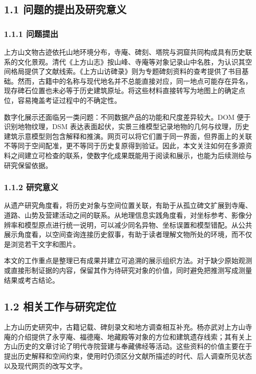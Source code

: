 \documentclass[UTF8,a4paper,zihao=-4]{ctexart}
\begin{document}
\subsection*{1.1 问题的提出及研究意义}

\subsubsection*{1.1.1 问题提出}

上方山文物古迹依托山地环境分布，寺庵、碑刻、塔院与洞窟共同构成具有历史联系的文化景观。清代《上方山志》按山峰、寺庵等对象记录山中名胜，为认识其空间格局提供了文献线索\cite{r1}。《上方山访碑录》则为专题碑刻资料的查考提供了书目基础\cite{r2}。然而，古籍中的名称与现代地名并不总能直接对应，同一地点可能存在异名，现存碑石位置也未必等于历史建筑原址。将这些材料直接转写为地图上的确定点位，容易掩盖考证过程中的不确定性。


数字化展示还面临另一类问题：不同数据产品的功能和尺度差异较大。DOM 便于识别地物纹理，DSM 表达表面起伏，实景三维模型记录地物的几何与纹理，历史建筑示意模型则包含解释和推演。网页可以将它们置于同一界面，但界面上的关联不等同于空间配准，更不等同于历史复原得到验证。因此，本文关注如何在多源资料之间建立可检查的联系，使数字化成果既能用于阅读和展示，也能为后续测绘与研究保留依据。


\subsubsection*{1.1.2 研究意义}

从遗产研究角度看，将历史对象与空间位置关联，有助于从孤立碑文扩展到寺庵、道路、山势及营建活动之间的联系。从地理信息实践角度看，对坐标参考、影像分辨率和模型原点进行统一说明，可以减少同名异物、坐标误置和模型错配。从公共展示角度看，以空间查询连接历史叙事，有助于读者理解文物所处的环境，而不仅是浏览若干文字和图片。


本文的工作重点是整理已有成果并建立可追溯的展示组织方法。对于缺少原始观测或直接形制证据的内容，保留其作为待研究对象的价值，同时避免把推测写成测量结果或考古结论。


\subsection*{1.2 相关工作与研究定位}

上方山历史研究中，古籍记载、碑刻录文和地方调查相互补充。杨亦武对上方山寺庵的介绍提供了永亨庵、福德庵、地藏殿等对象的方位和建筑遗存线索\cite{r3}；其有关上方山历史的文章讨论了明代寺院营建与奉藏佛经等活动\cite{r4}。这些资料的价值主要在于提出历史解释和空间约束，使用时仍须区分文献所描述的时代、后人调查所见状态以及现代网页的改写文字。
\end{document}
